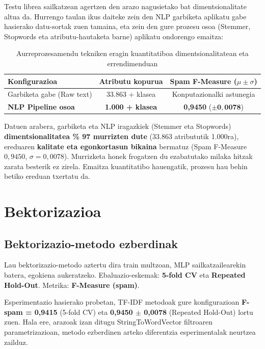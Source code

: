 \documentclass[12pt, a4paper]{article}
\begin{document}
Testu librea sailkatzean agertzen den arazo nagusietako bat dimentsionalitate altua da. Hurrengo taulan ikus daiteke zein den NLP garbiketa aplikatu gabe hasierako datu-sortak zuen tamaina, eta zein den gure prozesu osoa (Stemmer, Stopwords eta atributu-hautaketa barne) aplikatu ondorengo emaitza:

\begin{table}[H]
    \centering
    \caption{Aurreprozesamendu tekniken eragin kuantitatiboa dimentsionalitatean eta errendimenduan}
    \begin{tabular}{lcc}
        \toprule
        \textbf{Konfigurazioa} & \textbf{Atributu kopurua} & \textbf{Spam F-Measure ($\mu \pm \sigma$)} \\
        \midrule
        Garbiketa gabe (Raw text) & 33.863 + klasea & Konputazionalki astunegia \\
        \textbf{NLP Pipeline osoa} & \textbf{1.000 + klasea} & \textbf{0,9450} ($\pm \mathbf{0{,}0078}$) \\
        \bottomrule
    \end{tabular}
    \label{tab:aurreprozesamendu_eragina}
\end{table}


Datuen arabera, garbiketa eta NLP iragazkiek (Stemmer eta Stopwords) \textbf{dimentsionalitatea \% 97 murrizten dute} (33.863 atribututik 1.000ra), ereduaren \textbf{kalitate eta egonkortasun bikaina} bermatuz (Spam F-Measure $0{,}9450$, $\sigma=0{,}0078$). Murrizketa honek frogatzen du ezabatutako milaka hitzak zarata besterik ez zirela. Emaitza kuantitatibo hauengatik, prozesu hau behin betiko ereduan txertatu da.

\newpage
\section{Bektorizazioa}

\subsection{Bektorizazio-metodo ezberdinak}
Lau bektorizazio-metodo aztertu dira train multzoan, MLP sailkatzailearekin batera, egokiena aukeratzeko. Ebaluazio-eskemak: \textbf{5-fold CV} eta \textbf{Repeated Hold-Out}.
Metrika: \textbf{F-Measure (spam)}.

Esperimentazio hasierako probetan, TF-IDF metodoak gure konfigurazioan \textbf{F-spam = 0,9415} (5-fold CV) eta \textbf{0,9450 $\pm$ 0,0078} (Repeated Hold-Out) lortu zuen. Hala ere, arazoak izan ditugu StringToWordVector filtroaren parametrizazioan, metodo ezberdinen arteko diferentzia esperimentalak neurtzea zailduz.
\end{document}
